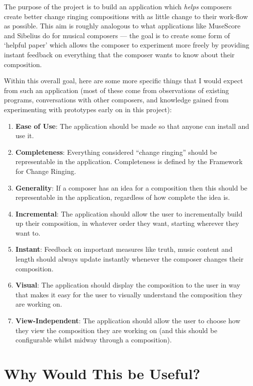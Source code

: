\documentclass[12pt]{article}
\begin{document}
The purpose of the project is to build an application which \emph{helps} composers create better
change ringing compositions with as little change to their work-flow as possible.  This aim is
roughly analogous to what applications like MuseScore and Sibelius do for musical composers --- the
goal is to create some form of `helpful paper' which allows the composer to experiment more freely
by providing instant feedback on everything that the composer wants to know about their composition.

Within this overall goal, here are some more specific things that I would expect from such an
application (most of these come from observations of existing programs, conversations with other
composers, and knowledge gained from experimenting with prototypes early on in this project):

\begin{enumerate}
    \item \textbf{Ease of Use}: The application should be made so that anyone can install and use
        it.
    \item \textbf{Completeness}: Everything considered ``change ringing'' should be representable in
        the application.  Completeness is defined by the Framework for Change Ringing.
    \item \textbf{Generality}: If a composer has an idea for a composition then this should be
        representable in the application, regardless of how complete the idea is.
    \item \textbf{Incremental}: The application should allow the user to incrementally build up
        their composition, in whatever order they want, starting wherever they want to.
    \item \textbf{Instant}: Feedback on important measures like truth, music content and length
        should always update instantly whenever the composer changes their composition.
    \item \textbf{Visual}: The application should display the composition to the user in way that
        makes it easy for the user to visually understand the composition they are working on.
    \item \textbf{View-Independent}: The application should allow the user to choose how they view
        the composition they are working on (and this should be configurable whilst midway through a
        composition).
\end{enumerate}

\section{Why Would This be Useful?}
\end{document}
